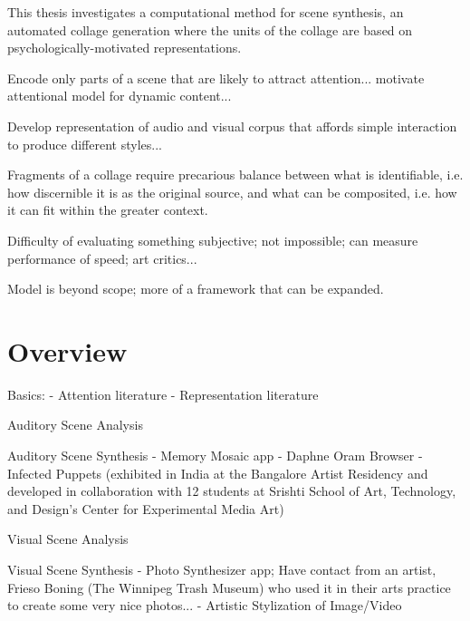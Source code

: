 \documentclass[a4paper,11pt,final]{ThesisStyle}
\begin{document}
This thesis investigates a computational method for scene synthesis, an automated collage generation where the units of the collage are based on psychologically-motivated representations.  


Encode only parts of a scene that are likely to attract attention... motivate attentional model for dynamic content... 

Develop representation of audio and visual corpus that affords simple interaction to produce different styles...

Fragments of a collage require precarious balance between what is identifiable, i.e. how discernible it is as the original source, and what can be composited, i.e. how it can fit within the greater context. 

Difficulty of evaluating something subjective; not impossible; can measure performance of speed; art critics...

Model is beyond scope; more of a framework that can be expanded.

\section{Overview}

Basics:
	- Attention literature
	- Representation literature

Auditory Scene Analysis

Auditory Scene Synthesis
	- Memory Mosaic app
	- Daphne Oram Browser
	- Infected Puppets (exhibited in India at the Bangalore Artist Residency and developed in collaboration with 12 students at Srishti School of Art, Technology, and Design's Center for Experimental Media Art)
	
Visual Scene Analysis

Visual Scene Synthesis
	- Photo Synthesizer app; Have contact from an artist, Frieso Boning (The Winnipeg Trash Museum) who used it in their arts practice to create some very nice photos...
	- Artistic Stylization of Image/Video
\end{document}
